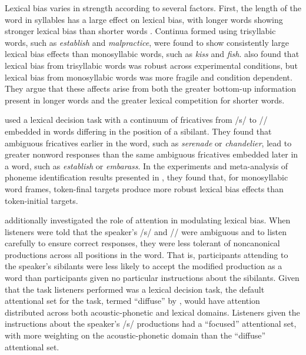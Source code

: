 Lexical bias varies in strength according to several factors.  
First, the length of the word in syllables has a large effect on lexical bias, with longer words showing stronger lexical bias than shorter words \citep{Pitt2006}.  
Continua formed using trisyllabic words, such as \emph{establish} and \emph{malpractice}, were found to show consistently large lexical bias effects than monosyllabic words, such as \emph{kiss} and \emph{fish}.  
\citet{Pitt2006} also found that lexical bias from trisyllabic words was robust across experimental conditions, but lexical bias from monosyllabic words was more fragile and condition dependent.  They argue that these affects arise from both the greater bottom-up information present in longer words and the greater lexical competition for shorter words.

\citet{Pitt2012} used a lexical decision task with a continuum of fricatives from /s/ to /\textesh/ embedded in words differing in the position of a sibilant.  
They found that ambiguous fricatives earlier in the word, such as \emph{serenade} or \emph{chandelier}, lead to greater nonword responses than the same ambiguous fricatives embedded later in a word, such as \emph{establish} or \emph{embarass}.  
In the experiments and meta-analysis of phoneme identification results presented in \citet{Pitt1993}, they found that, for monosyllabic word frames, token-final targets produce more robust lexical bias effects than token-initial targets.

\citet{Pitt2012} additionally investigated the role of attention in modulating lexical bias.  
When listeners were told that the speaker's /s/ and /\textesh/ were ambiguous and to listen carefully to ensure correct responses, they were less tolerant of noncanonical productions across all positions in the word.  
That is, participants attending to the speaker's sibilants were less likely to accept the modified production as a word than participants given no particular instructions about the sibilants.
Given that the task listeners performed was a lexical decision task, the default attentional set for the task, termed ``diffuse'' by \citet{Pitt2012}, would have attention distributed across both acoustic-phonetic and lexical domains.  Listeners given the instructions about the speaker's /s/ productions had a ``focused'' attentional set, with more weighting on the acoustic-phonetic domain than the ``diffuse'' attentional set.

